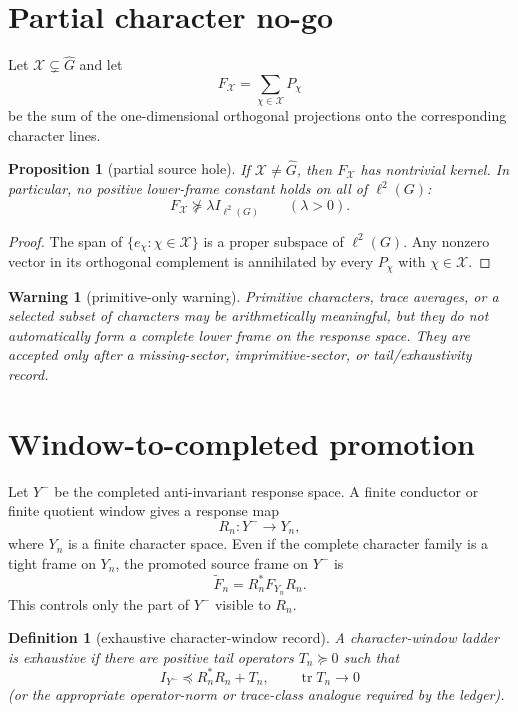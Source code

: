 \documentclass[11pt]{article}
\newtheorem{proposition}{Proposition}
\newtheorem{definition}{Definition}
\newtheorem{warning}{Warning}
\begin{document}
\section{Partial character no-go}
Let $\mathcal X\subsetneq\widehat G$ and let
\[
  F_{\mathcal X}=\sum_{\chi\in\mathcal X}P_\chi
\]
be the sum of the one-dimensional orthogonal projections onto the corresponding character lines.

\begin{proposition}[partial source hole]
If $\mathcal X\ne\widehat G$, then $F_{\mathcal X}$ has nontrivial kernel. In particular, no positive lower-frame constant holds on all of $\ell^2(G)$:
\[
  F_{\mathcal X}\not\succeq \lambda I_{\ell^2(G)}
  \qquad (\lambda>0).
\]
\end{proposition}

\begin{proof}
The span of $\{e_\chi:\chi\in\mathcal X\}$ is a proper subspace of $\ell^2(G)$.  Any nonzero vector in its orthogonal complement is annihilated by every $P_\chi$ with $\chi\in\mathcal X$.
\end{proof}

\begin{warning}[primitive-only warning]
Primitive characters, trace averages, or a selected subset of characters may be arithmetically meaningful, but they do not automatically form a complete lower frame on the response space.  They are accepted only after a missing-sector, imprimitive-sector, or tail/exhaustivity record.
\end{warning}

\section{Window-to-completed promotion}
Let $Y^-$ be the completed anti-invariant response space.  A finite conductor or finite quotient window gives a response map
\[
  R_n:Y^-\to Y_n,
\]
where $Y_n$ is a finite character space.  Even if the complete character family is a tight frame on $Y_n$, the promoted source frame on $Y^-$ is
\[
  \widetilde F_n=R_n^*F_{Y_n}R_n.
\]
This controls only the part of $Y^-$ visible to $R_n$.

\begin{definition}[exhaustive character-window record]
A character-window ladder is exhaustive if there are positive tail operators $T_n\succeq0$ such that
\[
  I_{Y^-}\preceq R_n^*R_n+T_n,
  \qquad
  \operatorname{tr}T_n\to0
\]
(or the appropriate operator-norm or trace-class analogue required by the ledger).
\end{definition}
\end{document}
